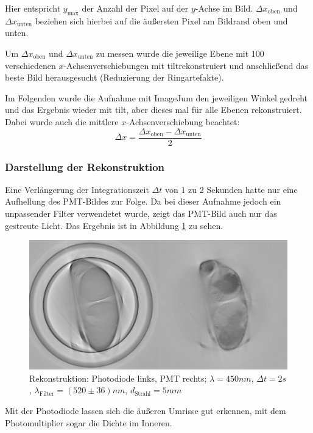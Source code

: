 Hier entspricht $y_\text{max}$ der Anzahl der Pixel auf der $y$-Achse im Bild.
$\Delta{x_\text{oben}}$ und $\Delta{x_\text{unten}}$ beziehen sich hierbei auf die äußersten Pixel am Bildrand oben und unten.

Um $\Delta{x_{\text{oben}}}$ und $\Delta{x_{\text{unten}}}$ zu messen wurde die jeweilige Ebene mit 100 verschiedenen $x$-Achsenverschiebungen mit  \glqq tilt\grqq rekonstruiert und anschließend das beste Bild herausgesucht (Reduzierung der Ringartefakte).

Im Folgenden wurde die Aufnahme mit \glqq ImageJ\grqq um den jeweiligen Winkel gedreht und das Ergebnis wieder mit  \glqq tilt\grqq , aber dieses mal für alle Ebenen rekonstruiert.
Dabei wurde auch die mittlere $x$-Achsenverschiebung beachtet:
$$\Delta{x} = \frac{\Delta{x_{\text{oben}}} - \Delta{x_{\text{unten}}}}{2}$$

\subsubsection{Darstellung der Rekonstruktion}
Eine Verlängerung der Integrationszeit $\Delta{t}$ von $1$ zu $2$ Sekunden hatte nur eine Aufhellung des PMT-Bildes zur Folge.
Da bei dieser Aufnahme jedoch ein unpassender Filter verwendetet wurde, zeigt das PMT-Bild auch nur das gestreute Licht. Das Ergebnis ist in Abbildung \ref{fig:lang-int} zu sehen.

\begin{figure}[ht]
\centering
\includegraphics[width=\linewidth]{IMAGE/both-2-450-5-1-c.png}
\caption{Rekonstruktion: Photodiode links, PMT rechts; $\lambda = 450 \si{nm}$, $\Delta{t} = 2 \si{s}$, $\lambda_\text{Filter} = (520 \pm 36) \si{nm}$, $d_\text{Strahl} = 5 \si{mm}$}
	\label{fig:lang-int}
\end{figure}

Mit der Photodiode lassen sich die äußeren Umrisse gut erkennen, mit dem Photomultiplier sogar die Dichte im Inneren.

